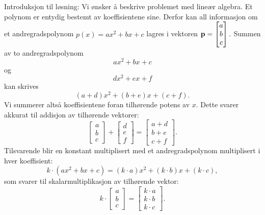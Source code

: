 \begin{losning}
Introduksjon til løsning: Vi ønsker å beskrive problemet med lineær algebra. Et polynom er entydig bestemt av koeffisientene sine. Derfor kan all informasjon om et andregradspolynom $p(x)=ax^2+bx+c$ lagres i vektoren $\mathbf{p}=\begin{bmatrix}
a\\
b\\
c
\end{bmatrix}.$ Summen av to andregradspolynom $$ax^2+bx+c$$ og $$dx^2+ex+f$$ kan skrives $$(a+d)x^2+(b+e)x+(c+f).$$ Vi summerer altså koeffisientene foran tilhørende potens av $x$. Dette svarer akkurat til addisjon av tilhørende vektorer: $$\begin{bmatrix}
a\\
b\\
c
\end{bmatrix}+\begin{bmatrix}
d\\
e\\
f
\end{bmatrix}=\begin{bmatrix}
a+d\\
b+e\\
c+f
\end{bmatrix}.$$ Tilsvarende blir en konstant multiplisert med et andregradspolynom multiplisert i hver koeffisient: $$k\cdot(ax^2+bx+c)=(k\cdot a)x^2+(k\cdot b)x+(k\cdot c),$$ som svarer til skalarmultiplikasjon av tilhørende vektor: $$k\cdot \begin{bmatrix}
a\\
b\\
c
\end{bmatrix}=\begin{bmatrix}
k\cdot a\\
k\cdot b\\
k\cdot c
\end{bmatrix}.$$


\end{losning}
